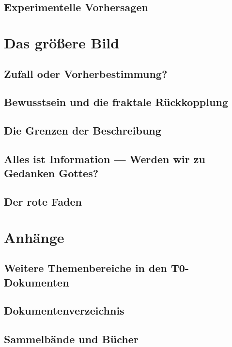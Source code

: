 \documentclass[11pt,twoside,openright]{book}
\begin{document}
\chapter{Experimentelle Vorhersagen}


\part{Das größere Bild}

\chapter{Zufall oder Vorherbestimmung?}


\chapter{Bewusstsein und die fraktale Rückkopplung}


\chapter{Die Grenzen der Beschreibung}


\chapter{Alles ist Information --- Werden wir zu Gedanken Gottes?}


\chapter{Der rote Faden}


\backmatter

\appendix
\part*{Anhänge}

\chapter{Weitere Themenbereiche in den T0-Dokumenten}


\chapter{Dokumentenverzeichnis}


\chapter{Sammelbände und Bücher}

\end{document}
